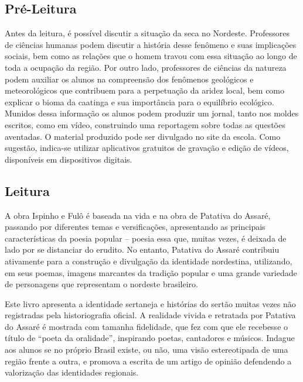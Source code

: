 \documentclass[12pt]{extarticle}
\begin{document}
\subsection{Pré-Leitura}

Antes da leitura, é possível discutir a situação da seca no
Nordeste. Professores de ciências humanas podem discutir a história
desse fenômeno e suas implicações sociais, bem como as relações que o
homem travou com essa situação ao longo de toda a ocupação da região.
Por outro lado, professores de ciências da natureza podem auxiliar os
alunos na compreensão dos fenômenos geológicos e meteorológicos que
contribuem para a perpetuação da aridez local, bem como explicar o bioma
da caatinga e sua importância para o equilíbrio ecológico. Munidos dessa
informação os alunos podem produzir um jornal, tanto nos moldes
escritos, como em vídeo, construindo uma reportagem sobre todas as
questões aventadas. O material produzido pode ser divulgado no site da
escola. Como sugestão, indica-se utilizar aplicativos gratuitos de
gravação e edição de vídeos, disponíveis em dispositivos digitais.


\subsection{Leitura}

A obra Ispinho e Fulô é baseada na vida e na obra de
Patativa do Assaré, passando por diferentes temas e versificações,
apresentando as principais características da poesia popular -- poesia
essa que, muitas vezes, é deixada de lado por se distanciar do erudito.
No entanto, Patativa do Assaré contribuiu ativamente para a construção e
divulgação da identidade nordestina, utilizando, em seus poemas, imagens
marcantes da tradição popular e uma grande variedade de personagens que
representam o nordeste brasileiro.

Este livro apresenta a identidade sertaneja e histórias do sertão muitas
vezes não registradas pela historiografia oficial. A realidade vivida e
retratada por Patativa do Assaré é mostrada com tamanha fidelidade, que
fez com que ele recebesse o título de ``poeta da oralidade'', inspirando
poetas, cantadores e músicos. Indague aos alunos se no próprio Brasil
existe, ou não, uma visão estereotipada de uma região frente a outra, e
promova a escrita de um artigo de opinião defendendo a valorização das
identidades regionais.
\end{document}
